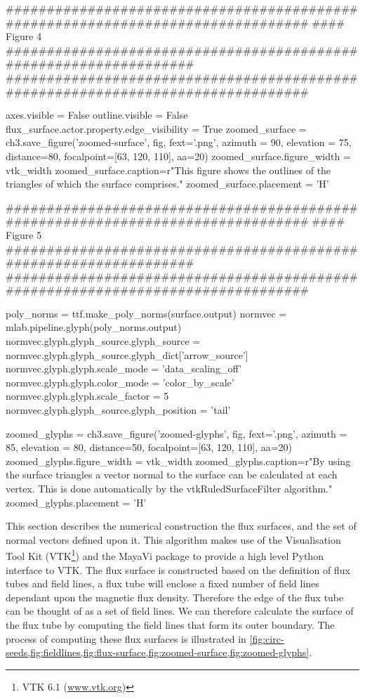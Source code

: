 \begin{pycode}[chapter3a]
################################################################################
#### Figure 4 ##################################################################
################################################################################

axes.visible = False
outline.visible = False
flux_surface.actor.property.edge_visibility = True
zoomed_surface = ch3.save_figure('zoomed-surface', fig, fext='.png', azimuth = 90, elevation = 75, distance=80, focalpoint=[63, 120, 110], aa=20)
zoomed_surface.figure_width = vtk_width
zoomed_surface.caption=r"This figure shows the outlines of the triangles of which the surface comprises."
zoomed_surface.placement = 'H'

################################################################################
#### Figure 5 ##################################################################
################################################################################

poly_norms = ttf.make_poly_norms(surface.output)
normvec = mlab.pipeline.glyph(poly_norms.output)
normvec.glyph.glyph_source.glyph_source = normvec.glyph.glyph_source.glyph_dict['arrow_source']
normvec.glyph.glyph.scale_mode = 'data_scaling_off'
normvec.glyph.glyph.color_mode = 'color_by_scale'
normvec.glyph.glyph.scale_factor = 5
normvec.glyph.glyph_source.glyph_position = 'tail'

zoomed_glyphs = ch3.save_figure('zoomed-glyphs', fig, fext='.png', azimuth = 85, elevation = 80, distance=50, focalpoint=[63, 120, 110], aa=20)
zoomed_glyphs.figure_width = vtk_width
zoomed_glyphs.caption=r"By using the surface triangles a vector normal to the surface can be calculated at each vertex. This is done automatically by the vtkRuledSurfaceFilter algorithm."
zoomed_glyphs.placement = 'H'
\end{pycode}

This section describes the numerical construction the flux surfaces, and the set of normal vectors defined upon it.
This algorithm makes use of the Visualisation Tool Kit (VTK\footnote{VTK 6.1 (\url{www.vtk.org})}) and the MayaVi package \cite{Ramachandran2011} to provide a high level Python interface to VTK.
The flux surface is constructed based on the definition of flux tubes and field lines, a flux tube will enclose a fixed number of field lines dependant upon the magnetic flux density.
Therefore the edge of the flux tube can be thought of as a set of field lines.
We can therefore calculate the surface of the flux tube by computing the field lines that form its outer boundary.
The process of computing these flux surfaces is illustrated in \cref{fig:circ-seeds,fig:fieldlines,fig:flux-surface,fig:zoomed-surface,fig:zoomed-glyphs}.

